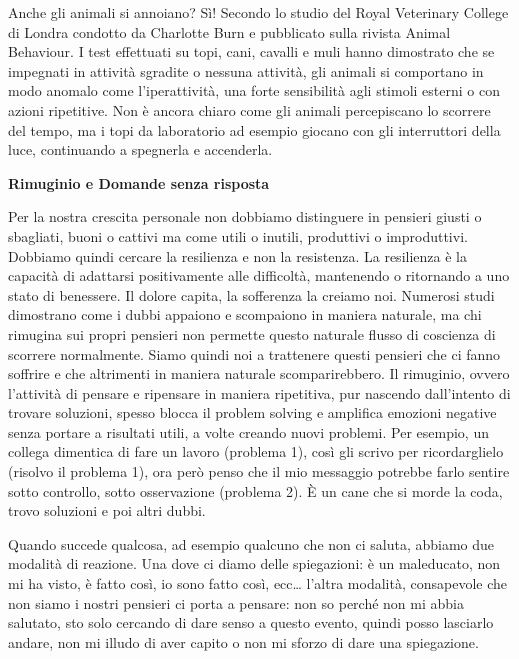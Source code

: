 \documentclass[12pt]{book} %
\begin{document}
\begin{mdframed}[linewidth=1pt]
Anche gli animali si annoiano? Sì! Secondo lo studio del Royal Veterinary College di Londra condotto da Charlotte Burn e
pubblicato sulla rivista Animal Behaviour. I test effettuati su topi, cani, cavalli e muli hanno dimostrato che se
impegnati in attività sgradite o nessuna attività, gli animali si comportano in modo anomalo come l'iperattività, una
forte sensibilità agli stimoli esterni o con azioni ripetitive. Non è ancora chiaro come gli animali percepiscano lo
scorrere del tempo, ma i topi da laboratorio ad esempio giocano con gli interruttori della luce, continuando a
spegnerla e accenderla. 
\end{mdframed}


\textbf{Rimuginio e Domande senza risposta}

Per la nostra crescita personale non dobbiamo distinguere in pensieri giusti o sbagliati, buoni o cattivi ma come utili
o inutili, produttivi o improduttivi. Dobbiamo quindi cercare la resilienza e non la resistenza. La resilienza è la capacità di adattarsi positivamente alle difficoltà, mantenendo o ritornando a uno stato di benessere. Il dolore capita, la sofferenza la creiamo noi. Numerosi studi dimostrano come i
dubbi appaiono e scompaiono in maniera naturale, ma chi rimugina sui propri pensieri non permette questo naturale
flusso di coscienza di scorrere normalmente. Siamo quindi noi a trattenere questi pensieri che ci fanno soffrire e
che altrimenti in maniera naturale scomparirebbero. Il rimuginio, ovvero l'attività di pensare e
ripensare in maniera ripetitiva, pur nascendo dall’intento di trovare soluzioni, spesso blocca il problem solving e amplifica emozioni negative senza portare a risultati utili, a volte creando nuovi problemi. Per esempio, un collega dimentica di fare un lavoro (problema 1), così gli scrivo per
ricordarglielo (risolvo il problema 1), ora però penso che il mio messaggio potrebbe farlo sentire sotto controllo,
sotto osservazione (problema 2). È un cane che si morde la coda, trovo soluzioni e poi altri dubbi.

Quando succede qualcosa, ad esempio qualcuno che non ci saluta, abbiamo due modalità di reazione. Una dove ci diamo delle spiegazioni: è un maleducato, non mi ha visto, è fatto così, io sono fatto così, ecc… l'altra modalità, consapevole che non siamo i nostri pensieri ci porta a pensare: non so perché non mi abbia salutato, sto solo cercando di dare senso a questo evento, quindi posso lasciarlo andare, non mi illudo di aver capito o non mi sforzo di dare una spiegazione.
\end{document}
